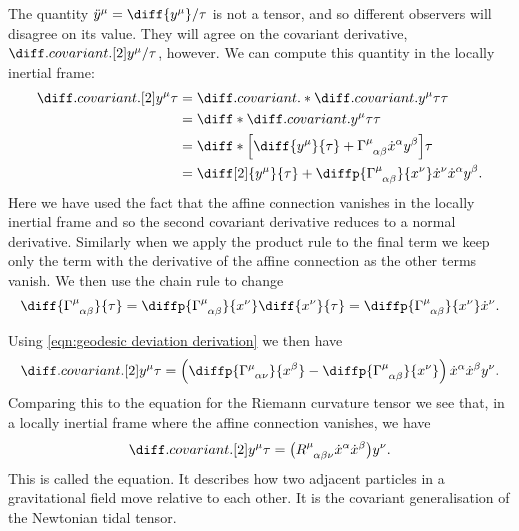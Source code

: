 \documentclass[fleqn]{NotesClass}
\newcommand*{\christoffel}[3]{\tensor{\Gamma}{^{#1}_{{#2}{#3}}}}
\begin{document}
    The quantity \(\ddot{y}^\mu = \diff{y^\mu}/{\tau}\) is not a tensor, and so different observers will disagree on its value.
    They will agree on the covariant derivative, \(\diffcov[2]{y^\mu}/{\tau}\), however.
    We can compute this quantity in the locally inertial frame:
    \begin{align}
        \diffcov[2]{y^\mu}{\tau} &= \diffcov*{\diffcov{y^\mu}{\tau}}{\tau}\\
        &= \diff*{\diffcov{y^\mu}{\tau}}{\tau}\\
        &= \diff*{\left[ \diff{y^\mu}{\tau} + \christoffel{\mu}{\alpha}{\beta} \dot{x}^\alpha y^\beta \right]}{\tau}\\
        &= \diff[2]{y^\mu}{\tau} + \diffp{\christoffel{\mu}{\alpha}{\beta}}{x^\nu} \dot{x}^\nu \dot{x}^\alpha y^\beta.
    \end{align}
    Here we have used the fact that the affine connection vanishes in the locally inertial frame and so the second covariant derivative reduces to a normal derivative.
    Similarly when we apply the product rule to the final term we keep only the term with the derivative of the affine connection as the other terms vanish.
    We then use the chain rule to change
    \begin{equation}
        \diff{\christoffel{\mu}{\alpha}{\beta}}{\tau} = \diffp{\christoffel{\mu}{\alpha}{\beta}}{x^\nu}\diff{x^\nu}{\tau} = \diffp{\christoffel{\mu}{\alpha}{\beta}}{x^\nu}\dot{x}^\nu.
    \end{equation}
    
    Using \cref{eqn:geodesic deviation derivation} we then have
    \begin{equation}
        \diffcov[2]{y^\mu}{\tau} = \left( \diffp{\christoffel{\mu}{\alpha}{\nu}}{x^\beta} - \diffp{\christoffel{\mu}{\alpha}{\beta}}{x^\nu} \right)\dot{x}^\alpha\dot{x}^\beta y^\nu.
    \end{equation}
    Comparing this to the equation for the Riemann curvature tensor we see that, in a locally inertial frame where the affine connection vanishes, we have
    \begin{equation}
        \diffcov[2]{y^\mu}{\tau} = \big( \tensor{R}{^\mu_{\alpha\beta\nu}}\dot{x}^\alpha\dot{x}^\beta \big) y^\nu.
    \end{equation}
    This is called the  equation.
    It describes how two adjacent particles in a gravitational field move relative to each other.
    It is the covariant generalisation of the Newtonian tidal tensor.
    
\end{document}

